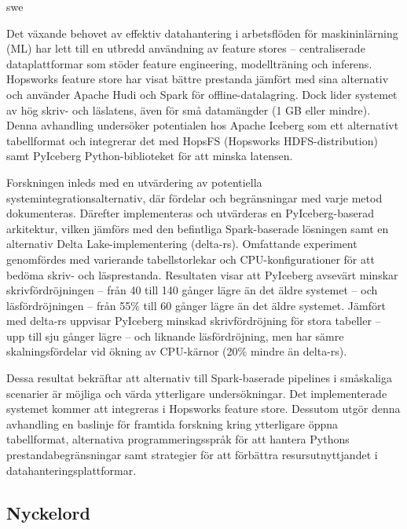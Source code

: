 \markboth{\abstractname}{}
\begin{scontents}[store-env=lang]
swe
\end{scontents}



\begin{scontents}[store-env=abstracts,print-env=true]
Det växande behovet av effektiv datahantering i arbetsflöden för maskininlärning (ML) har lett till en utbredd användning av feature stores -- centraliserade dataplattformar som stöder feature engineering, modellträning och inferens. Hopsworks feature store har visat bättre prestanda jämfört med sina alternativ och använder Apache Hudi och Spark för offline-datalagring. Dock lider systemet av hög skriv- och läslatens, även för små datamängder (1 GB eller mindre). Denna avhandling undersöker potentialen hos Apache Iceberg som ett alternativt tabellformat och integrerar det med HopsFS (Hopsworks HDFS-distribution) samt PyIceberg Python-biblioteket för att minska latensen.

Forskningen inleds med en utvärdering av potentiella systemintegrationsalternativ, där fördelar och begränsningar med varje metod dokumenteras. Därefter implementeras och utvärderas en PyIceberg-baserad arkitektur, vilken jämförs med den befintliga Spark-baserade lösningen samt en alternativ Delta Lake-implementering (delta-rs). Omfattande experiment genomfördes med varierande tabellstorlekar och CPU-konfigurationer för att bedöma skriv- och läsprestanda. Resultaten visar att PyIceberg avsevärt minskar skrivfördröjningen -- från 40 till 140 gånger lägre än det äldre systemet -- och läsfördröjningen -- från 55\% till 60 gånger lägre än det äldre systemet. Jämfört med delta-rs uppvisar PyIceberg minskad skrivfördröjning för stora tabeller -- upp till sju gånger lägre -- och liknande läsfördröjning, men har sämre skalningsfördelar vid ökning av CPU-kärnor (20\% mindre än delta-rs).

Dessa resultat bekräftar att alternativ till Spark-baserade pipelines i småskaliga scenarier är möjliga och värda ytterligare undersökningar. Det implementerade systemet kommer att integreras i Hopsworks feature store. Dessutom utgör denna avhandling en baslinje för framtida forskning kring ytterligare öppna tabellformat, alternativa programmeringsspråk för att hantera Pythons prestandabegränsningar samt strategier för att förbättra resursutnyttjandet i datahanteringsplattformar.
\end{scontents}



\subsection*{Nyckelord}
\begin{scontents}[store-env=keywords,print-env=true]
\end{scontents}
